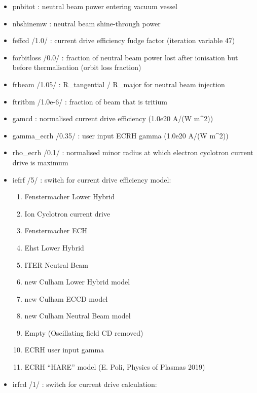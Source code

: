\documentclass[]{article}
\providecommand{\tightlist}{%
  \setlength{\itemsep}{0pt}\setlength{\parskip}{0pt}}
\begin{document}
\begin{itemize}
\item
  pnbitot : neutral beam power entering vacuum vessel
\item
  nbshinemw : neutral beam shine-through power
\item
  feffcd /1.0/ : current drive efficiency fudge factor (iteration
  variable 47)
\item
  forbitloss /0.0/ : fraction of neutral beam power lost after
  ionisation but before thermalisation (orbit loss fraction)
\item
  frbeam /1.05/ : R\_tangential / R\_major for neutral beam injection
\item
  ftritbm /1.0e-6/ : fraction of beam that is tritium
\item
  gamcd : normalised current drive efficiency (1.0e20 A/(W m\^{}2))
\item
  gamma\_ecrh /0.35/ : user input ECRH gamma (1.0e20 A/(W m\^{}2))
\item
  rho\_ecrh /0.1/ : normalised minor radius at which electron cyclotron
  current drive is maximum
\item
  iefrf /5/ : switch for current drive efficiency model:

  \begin{enumerate}
  \tightlist
  \item
    Fenstermacher Lower Hybrid
  \item
    Ion Cyclotron current drive
  \item
    Fenstermacher ECH
  \item
    Ehst Lower Hybrid
  \item
    ITER Neutral Beam
  \item
    new Culham Lower Hybrid model
  \item
    new Culham ECCD model
  \item
    new Culham Neutral Beam model
  \item
    Empty (Oscillating field CD removed)
  \item
    ECRH user input gamma
  \item
    ECRH ``HARE'' model (E. Poli, Physics of Plasmas 2019)
  \end{enumerate}
\item
  irfcd /1/ : switch for current drive calculation:


\end{itemize}
\end{document}
